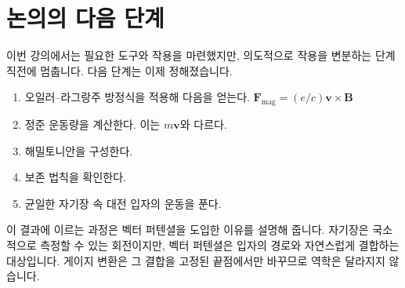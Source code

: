 \section{논의의 다음 단계}

이번 강의에서는 필요한 도구와 작용을 마련했지만, 의도적으로 작용을 변분하는 단계 직전에 멈춥니다. 다음 단계는 이제 정해졌습니다.
\begin{enumerate}
  \item 오일러--라그랑주 방정식을 적용해 다음을 얻는다.
  \(\mathbf F_{\mathrm{mag}}=(e/c)\mathbf v\times\mathbf B\)
  \item 정준 운동량을 계산한다. 이는 \(m\mathbf v\)와 다르다.
  \item 해밀토니안을 구성한다.
  \item 보존 법칙을 확인한다.
  \item 균일한 자기장 속 대전 입자의 운동을 푼다.
\end{enumerate}

이 결과에 이르는 과정은 벡터 퍼텐셜을 도입한 이유를 설명해 줍니다. 자기장은 국소적으로 측정할 수 있는 회전이지만, 벡터 퍼텐셜은 입자의 경로와 자연스럽게 결합하는 대상입니다. 게이지 변환은 그 결합을 고정된 끝점에서만 바꾸므로 역학은 달라지지 않습니다.
